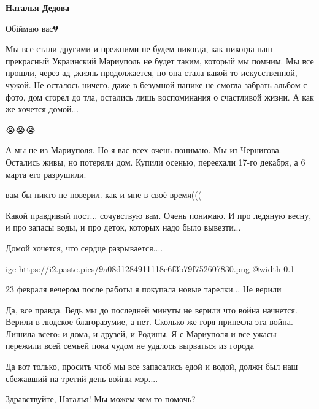 \textbf{Наталья Дедова}

Обіймаю вас💔


Мы все стали другими и прежними не будем никогда, как никогда наш прекрасный
Украинский Мариуполь не будет таким, который мы помним. Мы все прошли, через
ад ,жизнь продолжается, но она стала какой то искусственной, чужой. Не
осталось ничего, даже в безумной панике не смогла забрать альбом с фото, дом
сгорел до тла, остались лишь воспоминания о счастливой жизни. А как же хочется
домой...

😭😭😭


А мы не из Мариуполя. Но я вас всех очень понимаю. Мы из Чернигова. Остались
живы, но потеряли дом. Купили осенью, переехали 17-го декабря, а 6 марта его
разрушили.


вам бы никто не поверил. как и мне в своё время(((


Какой правдивый пост... сочувствую вам. Очень понимаю. И про ледяную весну, и
про запасы воды, и про деток, которых надо было вывезти...

Домой хочется, что сердце разрывается....


\ifcmt
  igc https://i2.paste.pics/9a08d1284911118e6f3b79f752607830.png
	@width 0.1
\fi


23 февраля вечером после работы я покупала новые тарелки... Не верили


Да, все правда. Ведь мы до последней минуты не верили что война начнется.
Верили в людское благоразумие, а нет. Сколько же горя принесла эта война.
Лишила всего: и дома, и друзей, и Родины. Я с Мариуполя и все ужасы пережили
всей семьей пока чудом не удалось вырваться из города


Да вот только, просить чтоб мы все запасались едой и водой, должн был наш сбежавший на третий день войны мэр....


Здравствуйте, Наталья! Мы можем чем-то помочь?


